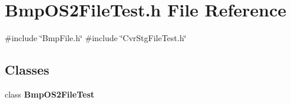 \section{Bmp\+O\+S2\+File\+Test.\+h File Reference}
\label{BmpOS2FileTest_8h}
{\ttfamily \#include \char`\"{}Bmp\+File.\+h\char`\"{}}\newline
{\ttfamily \#include \char`\"{}Cvr\+Stg\+File\+Test.\+h\char`\"{}}\newline
\subsection*{Classes}
\begin{DoxyCompactItemize}
\item 
class \textbf{ Bmp\+O\+S2\+File\+Test}
\end{DoxyCompactItemize}
